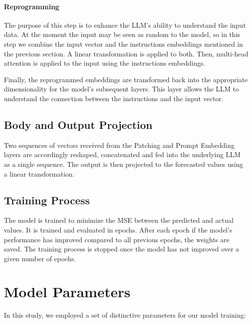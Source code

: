 \paragraph{Reprogramming}
The purpose of this step is to enhance the LLM's ability to understand the input data. At the moment the input may be seen as random to the model, so in this step we combine the input vector and the instructions embeddings mentioned in the previous section. A linear transformation is applied to both. Then, multi-head attention is applied to the input using the instructions embeddings.

Finally, the reprogrammed embeddings are transformed back into the appropriate dimensionality for the model's subsequent layers. This layer allows the LLM to understand the connection between the instructions and the input vector.

\subsection{Body and Output Projection}
Two sequences of vectors received from the Patching and Prompt Embedding layers are accordingly reshaped, concatenated and fed into the underlying LLM as a single sequence. The output is then projected to the forecasted values using a linear transformation.


\subsection{Training Process}

The model is trained to minimize the MSE between the predicted and actual values. It is trained and evaluated in epochs. After each epoch if the model's performance has improved compared to all previous epochs, the weights are saved. The training process is stopped once the model has not improved over a given number of epochs.

\section{Model Parameters}
In this study, we employed a set of distinctive parameters for our model training:

